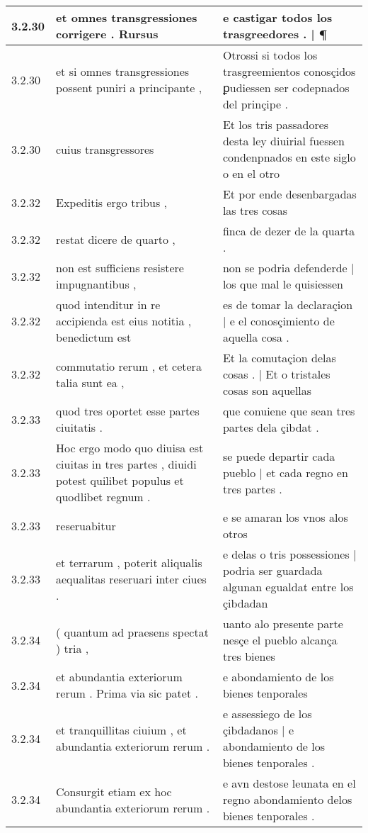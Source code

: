 \begin{tabular}{|p{1cm}|p{6.5cm}|p{6.5cm}|}
3.2.30 & et omnes transgressiones corrigere . Rursus & e castigar todos los trasgreedores . | ¶ \\\hline
3.2.30 & et si omnes transgressiones possent puniri a principante , & Otrossi si todos los trasgreemientos conosçidos ꝑudiessen ser codepnados del prinçipe . \\\hline
3.2.30 & cuius transgressores & Et los tris passadores desta ley diuirial fuessen condenpnados en este siglo o en el otro \\\hline
3.2.32 & Expeditis ergo tribus , & Et por ende desenbargadas las tres cosas \\\hline
3.2.32 & restat dicere de quarto , & finca de dezer de la quarta . \\\hline
3.2.32 & non est sufficiens resistere impugnantibus , & non se podria defenderde | los que mal le quisiessen \\\hline
3.2.32 & quod intenditur in re accipienda est eius notitia , benedictum est & es de tomar la declaraçion | e el conosçimiento de aquella cosa . \\\hline
3.2.32 & commutatio rerum , et cetera talia sunt ea , & Et la comutaçion delas cosas . | Et o tristales cosas son aquellas \\\hline
3.2.33 & quod tres oportet esse partes ciuitatis . & que conuiene que sean tres partes dela çibdat . \\\hline
3.2.33 & Hoc ergo modo quo diuisa est ciuitas in tres partes , diuidi potest quilibet populus et quodlibet regnum . & se puede departir cada pueblo | et cada regno en tres partes . \\\hline
3.2.33 & reseruabitur & e se amaran los vnos alos otros \\\hline
3.2.33 & et terrarum , poterit aliqualis aequalitas reseruari inter ciues . & e delas o tris possessiones | podria ser guardada algunan egualdat entre los çibdadan \\\hline
3.2.34 & ( quantum ad praesens spectat ) tria , & uanto alo presente parte nesçe el pueblo alcança tres bienes \\\hline
3.2.34 & et abundantia exteriorum rerum . Prima via sic patet . & e abondamiento de los bienes tenporales \\\hline
3.2.34 & et tranquillitas ciuium , et abundantia exteriorum rerum . & e assessiego de los çibdadanos | e abondamiento de los bienes tenporales . \\\hline
3.2.34 & Consurgit etiam ex hoc abundantia exteriorum rerum . & e avn destose leunata en el regno abondamiento delos bienes tenporales . \\\hline

\end{tabular}
